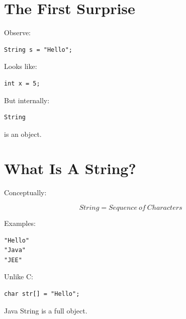 \documentclass[11pt,a4paper]{book}
\begin{document}

\section{The First Surprise}

Observe:

\begin{verbatim}
String s = "Hello";
\end{verbatim}


Looks like:

\begin{verbatim}
int x = 5;
\end{verbatim}


But internally:

\begin{verbatim}
String
\end{verbatim}

is an object.


\section{What Is A String?}

Conceptually:

\[
String
=
Sequence\ of\ Characters
\]


Examples:

\begin{verbatim}
"Hello"
"Java"
"JEE"
\end{verbatim}


Unlike C:\@


\begin{verbatim}
char str[] = "Hello";
\end{verbatim}


Java String is a full object.
\end{document}
